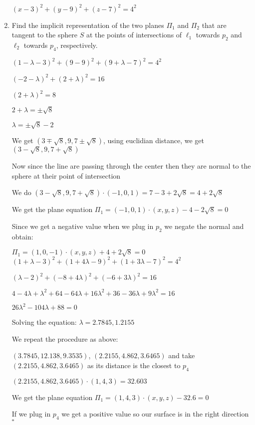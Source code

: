 \documentclass{article}
\begin{document}
\begin{enumerate}
        $(x - 3)^2 + (y - 9)^2 + (z - 7)^2 = 4^2$ 

        \item Find the implicit representation of the two planes $\Pi_1$ and $\Pi_2$ that are tangent to the sphere $S$ at the points of intersections of $\ell_1$ towards $p_2$ and $\ell_2$ towards $p_4$, respectively.
        
        $(1 - \lambda - 3)^2 + (9 - 9)^2 + (9 + \lambda - 7)^2 = 4^2$

        $(-2 - \lambda)^2 + (2 + \lambda)^2 = 16$

        $(2 + \lambda)^2 = 8$

        $2 + \lambda = \pm \sqrt{8}$

        $\lambda = \pm \sqrt{8} - 2$

        We get $(3 \mp \sqrt{8}, 9, 7 \pm \sqrt{8})$, using euclidian distance, we get $(3 - \sqrt{8}, 9, 7 + \sqrt{8})$

        Now since the line are passing through the center then they are normal to the sphere at their point of intersection

        We do $(3 - \sqrt{8}, 9, 7 + \sqrt{8}) \cdot (-1, 0, 1) = 7 - 3 + 2 \sqrt{8} = 4 + 2 \sqrt{8}$

        We get the plane equation $\Pi_1 = (-1, 0, 1) \cdot (x, y, z) - 4 - 2 \sqrt{8} = 0$

        Since we get a negative value when we plug in $p_2$ we negate the normal and obtain:

        $\Pi_1 = (1, 0, -1) \cdot (x, y, z) + 4 + 2 \sqrt{8} = 0$ \\

        $(1 + \lambda - 3)^2 + (1 + 4 \lambda - 9)^2 + (1 + 3 \lambda - 7)^2 = 4^2$

        $(\lambda - 2)^2 + (-8 + 4\lambda)^2 + (-6 + 3 \lambda)^2 = 16$

        $4 - 4 \lambda + \lambda^2 + 64 - 64\lambda + 16 \lambda^2 + 36 - 36\lambda + 9 \lambda^2 = 16$

        $26 \lambda^2 - 104 \lambda + 88 = 0$

        Solving the equation: $\lambda = 2.7845, 1.2155 $
        
        We repeat the procedure as above:

        $(3.7845 , 12.138, 9.3535)$, $(2.2155, 4.862, 3.6465)$ and take $(2.2155, 4.862, 3.6465)$ as its distance is the closest to $p_4$

        $(2.2155, 4.862, 3.6465) \cdot (1,4,3) = 32.603$

        We get the plane equation $\Pi_1 = (1, 4, 3) \cdot (x, y, z) - 32.6 = 0$

        If we plug in $p_4$ we get a positive value so our surface is in the right direction $\square$

    \end{enumerate}
\end{document}
